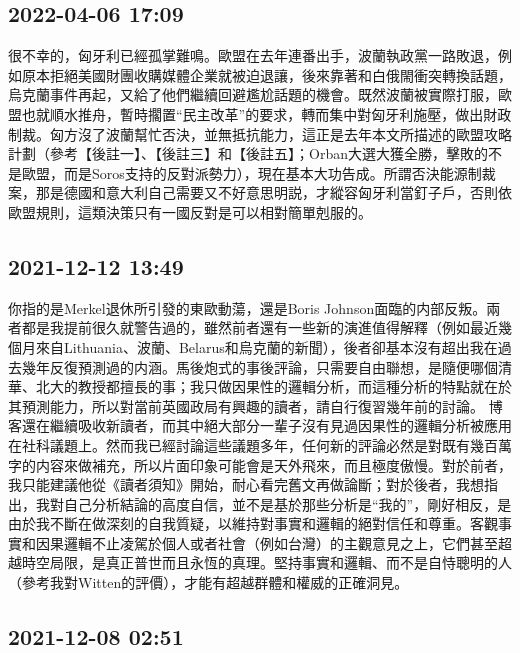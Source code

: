 \documentclass[twocolumn]{ctexart}
\begin{document}
\subsection*{2022-04-06 17:09}

很不幸的，匈牙利已經孤掌難鳴。歐盟在去年連番出手，波蘭執政黨一路敗退，例如原本拒絕美國財團收購媒體企業就被迫退讓，後來靠著和白俄閙衝突轉換話題，烏克蘭事件再起，又給了他們繼續回避尷尬話題的機會。既然波蘭被實際打服，歐盟也就順水推舟，暫時擱置“民主改革”的要求，轉而集中對匈牙利施壓，做出財政制裁。匈方沒了波蘭幫忙否決，並無抵抗能力，這正是去年本文所描述的歐盟攻略計劃（參考【後註一】、【後註三】和【後註五】；Orban大選大獲全勝，擊敗的不是歐盟，而是Soros支持的反對派勢力），現在基本大功告成。所謂否決能源制裁案，那是德國和意大利自己需要又不好意思明説，才縱容匈牙利當釘子戶，否則依歐盟規則，這類決策只有一國反對是可以相對簡單剋服的。
\subsection*{2021-12-12 13:49}

你指的是Merkel退休所引發的東歐動蕩，還是Boris Johnson面臨的内部反叛。兩者都是我提前很久就警告過的，雖然前者還有一些新的演進值得解釋（例如最近幾個月來自Lithuania、波蘭、Belarus和烏克蘭的新聞），後者卻基本沒有超出我在過去幾年反復預測過的内涵。馬後炮式的事後評論，只需要自由聯想，是隨便哪個清華、北大的教授都擅長的事；我只做因果性的邏輯分析，而這種分析的特點就在於其預測能力，所以對當前英國政局有興趣的讀者，請自行復習幾年前的討論。
博客還在繼續吸收新讀者，而其中絕大部分一輩子沒有見過因果性的邏輯分析被應用在社科議題上。然而我已經討論這些議題多年，任何新的評論必然是對既有幾百萬字的内容來做補充，所以片面印象可能會是天外飛來，而且極度傲慢。對於前者，我只能建議他從《讀者須知》開始，耐心看完舊文再做論斷；對於後者，我想指出，我對自己分析結論的高度自信，並不是基於那些分析是“我的”，剛好相反，是由於我不斷在做深刻的自我質疑，以維持對事實和邏輯的絕對信任和尊重。客觀事實和因果邏輯不止凌駕於個人或者社會（例如台灣）的主觀意見之上，它們甚至超越時空局限，是真正普世而且永恆的真理。堅持事實和邏輯、而不是自恃聰明的人（參考我對Witten的評價），才能有超越群體和權威的正確洞見。
\subsection*{2021-12-08 02:51}
\end{document}
